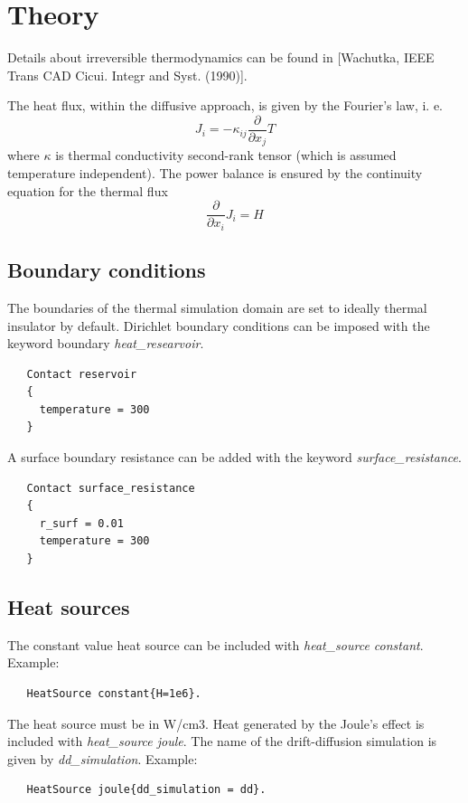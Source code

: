 \documentclass[11pt]{article} %
\begin{document}
\section{Theory}

Details about irreversible thermodynamics can be found in [Wachutka, IEEE Trans CAD Cicui. Integr and Syst. (1990)].

The heat flux, within the diffusive approach, is given by the Fourier’s law, i. e.
\begin{equation}
J_i = - \kappa_{ij} \frac{\partial}{\partial x_j} T
\end{equation}
where $\kappa$ is thermal conductivity second-rank tensor (which is assumed temperature independent). The power balance is ensured by the continuity equation for the thermal flux
\begin{equation}
\frac{\partial}{\partial x_i} J_i = H
\end{equation}



\subsection{Boundary conditions}

The boundaries of the thermal simulation domain are set to ideally thermal insulator by default.
Dirichlet boundary conditions can be imposed with the keyword boundary \emph{heat\_researvoir}. 
\begin{verbatim}
   Contact reservoir
   {
     temperature = 300
   }
\end{verbatim}
A surface boundary resistance can be added with the keyword  \emph{surface\_resistance}. 
\begin{verbatim}
   Contact surface_resistance
   {
     r_surf = 0.01
     temperature = 300
   }
\end{verbatim}

\subsection{Heat sources}

The constant value heat source can be included with \emph{heat\_source constant}. 
Example:  
\begin{verbatim}
   HeatSource constant{H=1e6}. 
\end{verbatim}

The heat source must be in W/cm3. Heat generated by the Joule’s effect is included with \emph{heat\_source joule}. The name of the drift-diffusion simulation is given by \emph{dd\_simulation}. 
Example:  
\begin{verbatim}
   HeatSource joule{dd_simulation = dd}. 
\end{verbatim}
\end{document}
